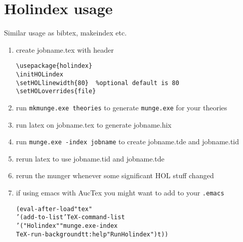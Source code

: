 \documentclass{article}
\begin{document}
\section{Holindex usage}

Similar usage as bibtex, makeindex etc.

\begin{enumerate}
\item create jobname.tex with header
\begin{verbatim}
\usepackage{holindex}
\initHOLindex
\setHOLlinewidth{80}  %optional default is 80
\setHOLoverrides{file}
\end{verbatim}
\item run \texttt{mkmunge.exe theories} to generate \texttt{munge.exe} for your theories
\item run latex on jobname.tex to generate jobname.hix
\item run \texttt{munge.exe -index jobname} to create jobname.tde and jobname.tid
\item rerun latex to use jobname.tid and jobname.tde
\item rerun the munger whenever some significant HOL stuff changed
\item if using emacs with AucTex you might want to add to your \texttt{.emacs}
\begin{alltt}
(eval-after-load "tex"
  '(add-to-list 'TeX-command-list
    '("Holindex" "munge.exe -index %s" 
       TeX-run-background t t :help "Run Holindex") t))
\end{alltt}
\end{enumerate}
\end{document}
